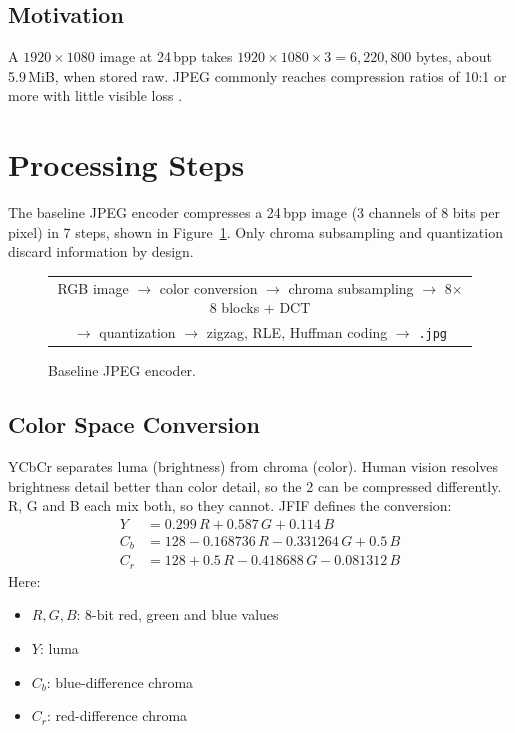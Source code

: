 \documentclass[11pt,a4paper]{article}
\begin{document}
\subsection{Motivation}

A $1920\times1080$ image at 24\,bpp takes $1920\times1080\times3=6{,}220{,}800$ bytes, about 5.9\,MiB, when stored raw. JPEG commonly reaches compression ratios of 10:1 or more with little visible loss \cite{wallace1992}.

\pagebreak

\section{Processing Steps}\label{sec:steps}

The baseline JPEG encoder \cite{wallace1992} compresses a 24\,bpp image (3 channels of 8 bits per pixel) in 7 steps, shown in Figure~\ref{fig:pipeline}. Only chroma subsampling and quantization discard information by design.

\begin{figure}[h]
\centering
\begin{tabular}{c}
RGB image $\rightarrow$ color conversion $\rightarrow$ chroma subsampling
$\rightarrow$ 8$\times$8 blocks + DCT \\
$\rightarrow$ quantization $\rightarrow$ zigzag, RLE, Huffman coding $\rightarrow$ \texttt{.jpg}
\end{tabular}
\caption{Baseline JPEG encoder.}
\label{fig:pipeline}
\end{figure}

\subsection{Color Space Conversion}

YCbCr separates luma (brightness) from chroma (color). Human vision resolves brightness detail better than color detail, so the 2 can be compressed differently. R, G and B each mix both, so they cannot. JFIF \cite{jfif} defines the conversion:
\begin{align*}
Y   &= 0.299\,R + 0.587\,G + 0.114\,B \\
C_b &= 128 - 0.168736\,R - 0.331264\,G + 0.5\,B \\
C_r &= 128 + 0.5\,R - 0.418688\,G - 0.081312\,B
\end{align*}
Here:
\begin{itemize}
\item $R, G, B$: 8-bit red, green and blue values
\item $Y$: luma
\item $C_b$: blue-difference chroma
\item $C_r$: red-difference chroma
\end{itemize}
\end{document}
